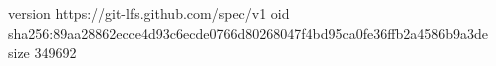 version https://git-lfs.github.com/spec/v1
oid sha256:89aa28862ecce4d93c6ecde0766d80268047f4bd95ca0fe36ffb2a4586b9a3de
size 349692
